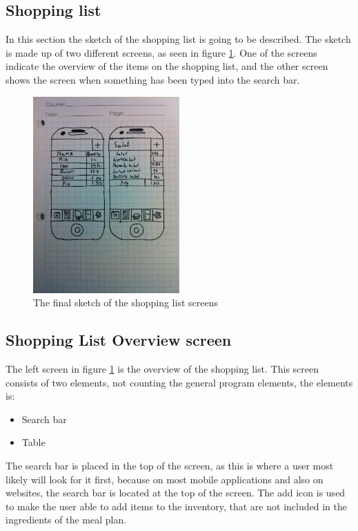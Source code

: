 \subsection{Shopping list}

In this section the sketch of the shopping list is going to be described. The sketch is made up of two different screens, as seen in figure \ref{FinalShoppingListSketch}. One of the screens indicate the overview of the items on the shopping list, and the other screen shows the screen when something has been typed into the search bar.

\begin{figure}[H]
    \centering
    \includegraphics[width=0.5\textwidth]{Grafik/FoodPlanner/FinalShoppingListSketch}
    \caption{The final sketch of the shopping list screens}
    \label{FinalShoppingListSketch}
\end{figure}

\subsection{Shopping List Overview screen}

The left screen in figure \ref{FinalShoppingListSketch} is the overview of the shopping list. This screen consists of two elements, not counting the general program elements, the elements is:

\begin{itemize}
	\item Search bar
	\item Table
\end{itemize}

The search bar is placed in the top of the screen, as this is where a user most likely will look for it first, because on most mobile applications and also on websites, the search bar is located at the top of the screen. The add icon is used to make the user able to add items to the inventory, that are not included in the ingredients of the meal plan.

